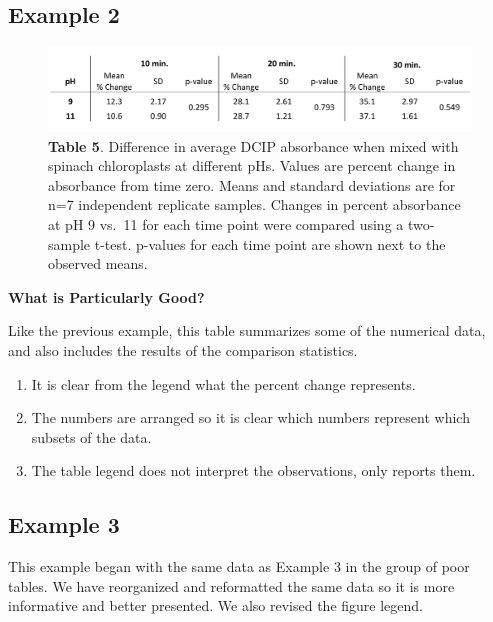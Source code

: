 \documentclass[
]{book}
\providecommand{\tightlist}{%
  \setlength{\itemsep}{0pt}\setlength{\parskip}{0pt}}
\begin{document}
\hypertarget{example-2-15}{%
\subsection{Example 2}\label{example-2-15}}

\begin{figure}
\centering
\includegraphics{images/Good_table2.png}
\caption{\textbf{Table 5}. Difference in average DCIP absorbance when mixed with spinach chloroplasts at different pHs. Values are percent change in absorbance from time zero. Means and standard deviations are for n=7 independent replicate samples. Changes in percent absorbance at pH 9 vs.~11 for each time point were compared using a two-sample t-test. p-values for each time point are shown next to the observed means.}
\end{figure}

\textbf{What is Particularly Good?}

Like the previous example, this table summarizes some of the numerical data, and also includes the results of the comparison statistics.

\begin{enumerate}
\def\labelenumi{\arabic{enumi}.}
\tightlist
\item
  It is clear from the legend what the percent change represents.
\item
  The numbers are arranged so it is clear which numbers represent which subsets of the data.
\item
  The table legend does not interpret the observations, only reports them.
\end{enumerate}

\hypertarget{example-3-12}{%
\subsection{Example 3}\label{example-3-12}}

This example began with the same data as Example 3 in the group of poor tables. We have reorganized and reformatted the same data so it is more informative and better presented. We also revised the figure legend.
\end{document}
